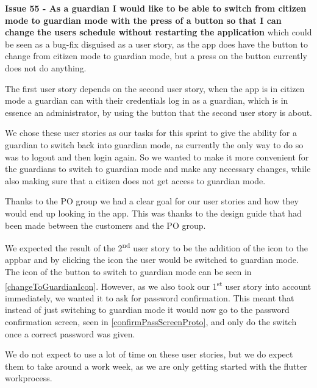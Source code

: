 \textbf{Issue 55 - As a guardian I would like to be able to switch from citizen mode to guardian mode with the press of a button so that I can change the users schedule without restarting the application} which could be seen as a bug-fix disguised as a user story, as the app does have the button to change from citizen mode to guardian mode, but a press on the button currently does not do anything.

The first user story depends on the second user story, when the app is in citizen mode a guardian can with their credentials log in as a guardian, which is in essence an administrator, by using the button that the second user story is about.

We chose these user stories as our tasks for this sprint to give the ability for a guardian to switch back into guardian mode, as currently the only way to do so was to logout and then login again.
So we wanted to make it more convenient for the guardians to switch to guardian mode and make any necessary changes, while also making sure that a citizen does not get access to guardian mode.

Thanks to the PO group we had a clear goal for our user stories and how they would end up looking in the app.
This was thanks to the design guide that had been made between the customers and the PO group.

We expected the result of the 2\textsuperscript{nd} user story to be the addition of the icon to the appbar and by clicking the icon the user would be switched to guardian mode.
The icon of the button to switch to guardian mode can be seen in \autoref{changeToGuardianIcon}.
However, as we also took our 1\textsuperscript{st} user story into account immediately, we wanted it to ask for password confirmation.
This meant that instead of just switching to guardian mode it would now go to the password confirmation screen, seen in \autoref{confirmPassScreenProto}, and only do the switch once a correct password was given.



We do not expect to use a lot of time on these user stories, but we do expect them to take around a work week, as we are only getting started with the flutter workprocess.
